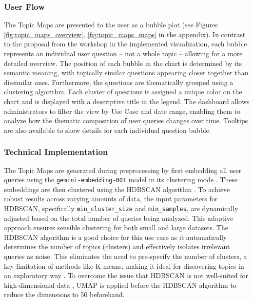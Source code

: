\documentclass[
	english,
	ruledheaders=section,%
	class=report,%
	thesis={type=bachelor},%
	accentcolor=1b,%
	custommargins=true,%
	marginpar=false,%
	parskip=half-,%
	fontsize=11pt,%
	DIV=14,
]{tudapub}
\begin{document}
\subsubsection{User Flow}
The Topic Maps are presented to the user as a bubble plot (see Figures \ref{fig:topic_maps_overview},  \ref{fig:topic_maps_maps} in the appendix). In contrast to the proposal from the workshop in the implemented visualization, each bubble represents an individual user question -- not a whole topic -- allowing for a more detailed overview. The position of each bubble in the chart is determined by its semantic meaning, with topically similar questions appearing closer together than dissimilar ones. Furthermore, the questions are thematically grouped using a clustering algorithm. Each cluster of questions is assigned a unique color on the chart and is displayed with a descriptive title in the legend. The dashboard allows administrators to filter the view by Use Case and date range, enabling them to analyze how the thematic composition of user queries changes over time. Tooltips are also available to show details for each individual question bubble.

\subsubsection{Technical Implementation}
The Topic Maps are generated during preprocessing by first embedding all user queries using the \texttt{gemini-embedding-001} model in its clustering mode \parencite{GoogleEmbedding001}. These embeddings are then clustered using the HDBSCAN algorithm \parencite{Malzer2021}. To achieve robust results across varying amounts of data, the input parameters for HDBSCAN, specifically \texttt{min\_cluster\_size} and \texttt{min\_samples}, are dynamically adjusted based on the total number of queries being analyzed. This adaptive approach ensures sensible clustering for both small and large datasets. The HDBSCAN algorithm is a good choice for this use case as it automatically determines the number of topics (clusters) and effectively isolates irrelevant queries as noise. This eliminates the need to pre-specify the number of clusters, a key limitation of methods like K-means, making it ideal for discovering topics in an exploratory way \parencite[p.~5]{Baligodugula2025}. To overcome the issue that HDBSCAN is not well-suited for high-dimensional data \parencite[p.~5]{Baligodugula2025}, UMAP \parencite{McInnes2020} is applied before the HDBSCAN algorithm to reduce the dimensions to 50 beforehand.
\end{document}
